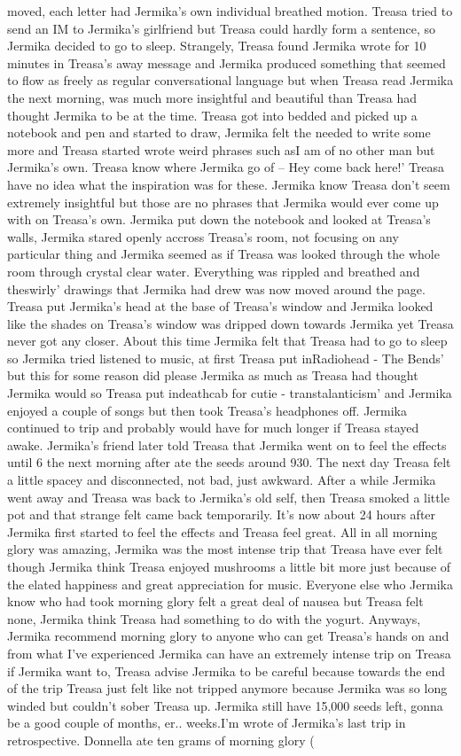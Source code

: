 \documentclass[12pt]{book}
\begin{document}
moved, each letter had Jermika's own individual breathed motion. Treasa tried to send an IM to Jermika's girlfriend but Treasa could hardly form a sentence, so Jermika decided to go to sleep. Strangely, Treasa found Jermika wrote for 10 minutes in Treasa's away message and Jermika produced something that seemed to flow as freely as regular conversational language but when Treasa read Jermika the next morning, was much more insightful and beautiful than Treasa had thought Jermika to be at the time. Treasa got into bedded and picked up a notebook and pen and started to draw, Jermika felt the needed to write some more and Treasa started wrote weird phrases such asI am of no other man but Jermika's own. Treasa know where Jermika go of -- Hey come back here!' Treasa have no idea what the inspiration was for these. Jermika know Treasa don't seem extremely insightful but those are no phrases that Jermika would ever come up with on Treasa's own. Jermika put down the notebook and looked at Treasa's walls, Jermika stared openly accross Treasa's room, not focusing on any particular thing and Jermika seemed as if Treasa was looked through the whole room through crystal clear water. Everything was rippled and breathed and theswirly' drawings that Jermika had drew was now moved around the page. Treasa put Jermika's head at the base of Treasa's window and Jermika looked like the shades on Treasa's window was dripped down towards Jermika yet Treasa never got any closer. About this time Jermika felt that Treasa had to go to sleep so Jermika tried listened to music, at first Treasa put inRadiohead - The Bends' but this for some reason did please Jermika as much as Treasa had thought Jermika would so Treasa put indeathcab for cutie - transtalanticism' and Jermika enjoyed a couple of songs but then took Treasa's headphones off. Jermika continued to trip and probably would have for much longer if Treasa stayed awake. Jermika's friend later told Treasa that Jermika went on to feel the effects until 6 the next morning after ate the seeds around 930. The next day Treasa felt a little spacey and disconnected, not bad, just awkward. After a while Jermika went away and Treasa was back to Jermika's old self, then Treasa smoked a little pot and that strange felt came back temporarily. It's now about 24 hours after Jermika first started to feel the effects and Treasa feel great. All in all morning glory was amazing, Jermika was the most intense trip that Treasa have ever felt though Jermika think Treasa enjoyed mushrooms a little bit more just because of the elated happiness and great appreciation for music. Everyone else who Jermika know who had took morning glory felt a great deal of nausea but Treasa felt none, Jermika think Treasa had something to do with the yogurt. Anyways, Jermika recommend morning glory to anyone who can get Treasa's hands on and from what I've experienced Jermika can have an extremely intense trip on Treasa if Jermika want to, Treasa advise Jermika to be careful because towards the end of the trip Treasa just felt like not tripped anymore because Jermika was so long winded but couldn't sober Treasa up. Jermika still have 15,000 seeds left, gonna be a good couple of months, er.. weeks.I'm wrote of Jermika's last trip in retrospective. Donnella ate ten grams of morning glory ( 
\end{document}
